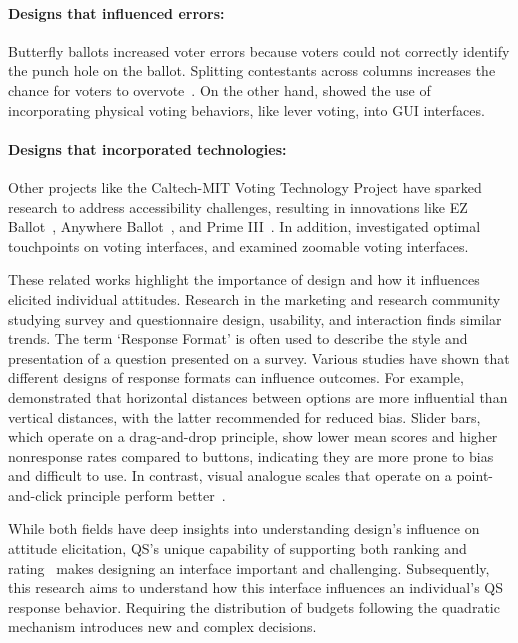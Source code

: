 \paragraph{Designs that influenced errors: } Butterfly ballots increased voter errors because voters could not correctly identify the punch hole on the ballot. Splitting contestants across columns increases the chance for voters to overvote~\cite{quesenberyOpinionGoodDesign2020}. On the other hand, \textcite{everettElectronicVotingMachines2008} showed the use of incorporating physical voting behaviors, like lever voting, into GUI interfaces.
\paragraph{Designs that incorporated technologies: } Other projects like the Caltech-MIT Voting Technology Project have sparked research to address accessibility challenges, resulting in innovations like EZ Ballot~\cite{leeUniversalDesignBallot2016}, Anywhere Ballot~\cite{summers2014making}, and Prime III~\cite{dawkinsPrimeIIIInnovative2009}. In addition, \textcite{gilbertAnomalyDetectionElectronic2013} investigated optimal touchpoints on voting interfaces, and \textcite{conradElectronicVotingEliminates2009} examined zoomable voting interfaces.

These related works highlight the importance of design and how it influences elicited individual attitudes. Research in the marketing and research community studying survey and questionnaire design, usability, and interaction finds similar trends. The term `Response Format' is often used to describe the style and presentation of a question presented on a survey. Various studies have shown that different designs of response formats can influence outcomes. For example, \textcite{weijtersExtremityHorizontalVertical2021} demonstrated that horizontal distances between options are more influential than vertical distances, with the latter recommended for reduced bias. Slider bars, which operate on a drag-and-drop principle, show lower mean scores and higher nonresponse rates compared to buttons, indicating they are more prone to bias and difficult to use. In contrast, visual analogue scales that operate on a point-and-click principle perform better~\cite{toepoelSlidersVisualAnalogue2018}. 

While both fields have deep insights into understanding design's influence on attitude elicitation, QS's unique capability of supporting both ranking and rating~\cite{chengCanShowWhat2021} makes designing an interface important and challenging. Subsequently, this research aims to understand how this interface influences an individual's QS response behavior. Requiring the distribution of budgets following the quadratic mechanism introduces new and complex decisions. 

